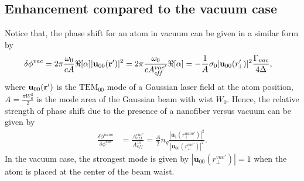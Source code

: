 \documentclass[preprint,aps,pra,onecolumn]{revtex4-1} %
\begin{document}
\subsection{Enhancement compared to the vacuum case}
Notice that, the phase shift for an atom in vacuum can be given in a similar form by
\begin{align}
\delta\phi^{vac} &= 2\pi \frac{\omega_0}{cA} \Re[\alpha] |\mathbf{u}_{00}(\mathbf{r}')|^2 =  2\pi \frac{\omega_0}{c A^{vac'}_{e\!f\!f}} \Re[\alpha]=-\frac{1}{A} \sigma_0 |\mathbf{u}_{00} (r'_{\!\perp})|^2 \frac{\Gamma_{vac}}{4\Delta},
\end{align}
where $\mathbf{u}_{00}(\mathbf{r}')  $ is the $\mathrm{TEM}_{00}$ mode of a Gaussian laser field at the atom position, $ A=\frac{\pi W_0^2}{2} $ is the mode area of the Gaussian beam with wist $ W_0 $. Hence, the relative strength of phase shift due to the presence of a nanofiber versus vacuum can be given by
\begin{align}
\frac{\delta\phi^{nano}}{\delta\phi^{vac}} &=\frac{A_{e\!f\!f}^{vac'}}{A_{e\!f\!f}^{11}}= \frac{A}{2} \!n_g\! \frac{|\mathbf{u}_1(r_\perp^{nano'})|^2}{|\mathbf{u}_{00}(r_\perp^{vac'})|^2}.
\end{align}
In the vacuum case, the strongest mode is given by $ |\mathbf{u}_{00}(r_\perp^{vac'})|=1 $ when the atom is placed at the center of the beam waist. 

\end{document}
